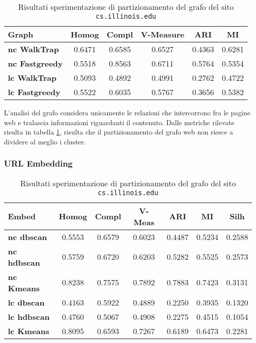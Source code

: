 \begin{table}[H]
	\begin{tabular}{| l | c | c | c | c | c |}
	\hline
	\textbf{Graph}  & \textbf{Homog} & \textbf{Compl} & \textbf{V-Measure}  & \textbf{ARI}  & \textbf{MI} \\ [3ex] \hline
	\textbf{nc WalkTrap} & 0.6471 & 0.6585 & 0.6527 & 0.4363 & 0.6281\\ [3ex]
	 \hline
	\textbf{nc Fastgreedy} & 0.5518 & 0.8563 & 0.6711 & 0.5764 & 0.5354\\ [3ex]
	 \hline	
	\textbf{lc WalkTrap} & 0.5093 & 0.4892 & 0.4991 & 0.2762 & 0.4722\\ [3ex]
	 \hline	
	\textbf{lc Fastgreedy} & 0.5522 & 0.6035 & 0.5767 & 0.3656 & 0.5382\\ [3ex]
	\hline
	\end{tabular}
	\caption{Risultati sperimentazione di partizionamento del grafo del sito \texttt{cs.illinois.edu}}
	\label{metricheGraphIll}
\end{table}

L'analisi del grafo considera unicamente le relazioni che intercorrono fra le pagine web e tralascia informazioni riguardanti il contenuto. Dalle metriche rilevate risulta in tabella \ref{metricheGraphIll}, risulta che il partizionamento del grafo web non riesce a dividere al meglio i cluster.


\subsubsection{URL Embedding}

\begin{table}[H]
	\begin{tabular}{| l | c | c | c | c | c | c |}
	\hline
	\textbf{Embed}  & \textbf{Homog} & \textbf{Compl} & \textbf{V-Meas}  & \textbf{ARI}  & \textbf{MI}  & \textbf{Silh} \\ [3ex] \hline
	\textbf{nc dbscan} & 0.5553 & 0.6579 & 0.6023 & 0.4487 & 0.5234 & 0.2588\\ [3ex]
	 \hline 
	\textbf{nc hdbscan} & 0.5759 & 0.6720 & 0.6203 & 0.5282 & 0.5525 & 0.2573\\ [3ex]
	 \hline
	\textbf{nc Kmeans} & 0.8238 & 0.7575 & 0.7892 & 0.7883 & 0.7423 & 0.3131\\ [3ex]
	 \hline	
	\textbf{lc dbscan} & 0.4163 & 0.5922 & 0.4889 & 0.2250 & 0.3935 & 0.1320\\ [3ex]
	\hline
	\textbf{lc hdbscan} & 0.4760 & 0.5067 & 0.4908 & 0.2275 & 0.4515 & 0.1054\\ [3ex]
	\hline
	
	\textbf{lc Kmeans} & 0.8095 & 0.6593 & 0.7267 & 0.6189 & 0.6473 & 0.2281\\ [3ex]
	\hline
	\end{tabular}
	\caption{Risultati sperimentazione di partizionamento del grafo del sito \texttt{cs.illinois.edu}}
	\label{metricheEmbed}
\end{table}

